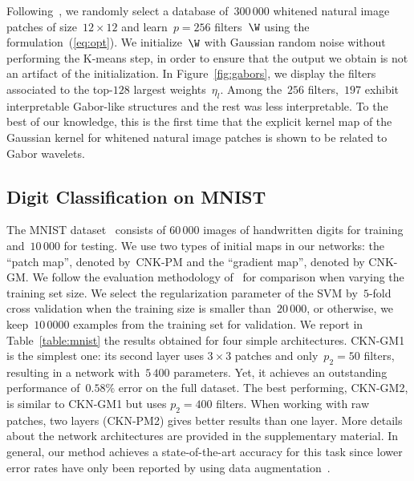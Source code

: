 Following~\cite{olshausen}, we randomly select a database of~$300\,000$
whitened natural image patches of size~$12 \times 12$ and learn~$p=256$
filters~$\W$ using the formulation~(\ref{eq:opt}). We initialize~$\W$
with Gaussian random noise without performing the K-means step, in order to ensure that
the output we obtain is not an artifact of the initialization.
In Figure~\ref{fig:gabors}, we display the filters associated to the
top-$128$ largest weights~$\eta_l$. Among the~$256$ filters,~$197$ exhibit
interpretable Gabor-like structures and the rest was less interpretable.
To the best of our knowledge, this is the first time that the explicit kernel
map of the Gaussian kernel for whitened natural image patches is shown to be
related to Gabor wavelets.

\subsection{Digit Classification on MNIST}
The MNIST dataset~\cite{lecun1998} consists of $60\,000$ images of handwritten
digits for training and~$10\,000$ for testing. We use two types of initial
maps in our networks: the ``patch map'', denoted by~CNK-PM and the
``gradient map'', denoted by CNK-GM. We follow the evaluation methodology
of~\cite{ranzato2007} for comparison
when varying the training set size. 
We select the regularization parameter of the SVM by~$5$-fold cross validation when the
training size is smaller than~$20\,000$, or otherwise, we keep~$10\,0000$
examples from the training set for validation.  We report in
Table~\ref{table:mnist} the results obtained for four simple architectures.
CKN-GM1 is the simplest one: its second layer uses $3 \times 3$ patches and
only~$p_2=50$ filters, resulting in a network with~$5\,400$ parameters. Yet, it
achieves an outstanding performance of~$0.58\%$ error on the full dataset.
The best performing, CKN-GM2, is similar to CKN-GM1 but uses $p_2=400$ filters.
When working with raw patches, two layers (CKN-PM2) gives better results than
one layer.  More details about the network architectures are provided in the
supplementary material. In general, our method achieves 
a state-of-the-art accuracy for this task since lower error rates have only
been reported by using data augmentation~\cite{ciresan2012}.

